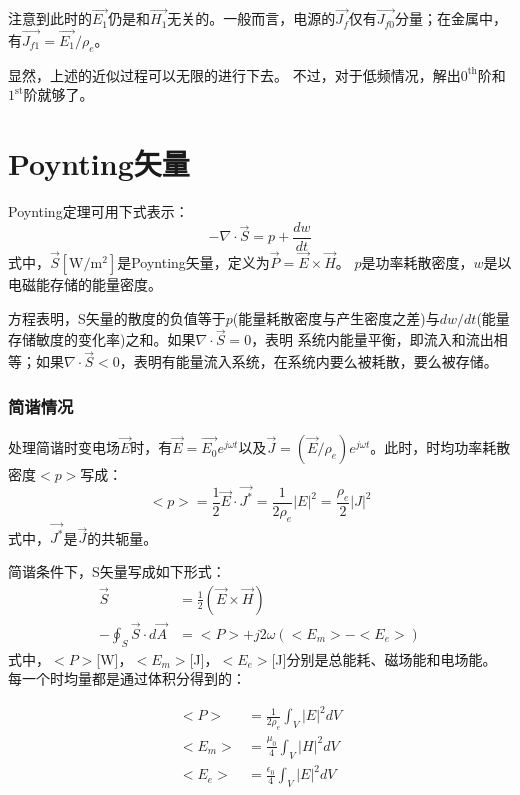 注意到此时的$\vec{E_1}$仍是和$\vec{H_1}$无关的。一般而言，电源的$\vec{J_f}$仅有$\vec{J_{f0}}$分量；在金属中，有$\vec{J_{f1}}=\vec{E_1}/\rho_e$。

显然，上述的近似过程可以无限的进行下去。
不过，对于低频情况，解出$\mathrm{0^{th}}$阶和$\mathrm{1^{st}}$阶就够了。

\section{Poynting矢量}
Poynting定理可用下式表示：
\begin{equation}\label{eqn:poynting}
-\nabla\cdot \vec{S}=p+\frac{dw}{dt}
\end{equation}
式中，$\vec{S}[\mathrm{W/m^2}]$是Poynting矢量，定义为$\vec{P}=\vec{E}\times \vec{H}$。
$p$是功率耗散密度，$w$是以电磁能存储的能量密度。

方程表明，S矢量的散度的负值等于$p$(能量耗散密度与产生密度之差)与$dw/dt$(能量存储敏度的变化率)之和。如果$\nabla \cdot \vec{S}=0$，表明
系统内能量平衡，即流入和流出相等；如果$\nabla \cdot \vec{S}<0$，表明有能量流入系统，在系统内要么被耗散，要么被存储。

\subsubsection{简谐情况}
处理简谐时变电场$\vec{E}$时，有$\vec{E}=\vec{E_0}e^{j\omega t}$以及$\vec{J}=(\vec{E}/\rho_e)e^{j\omega t}$。此时，时均功率耗散密度$<p>$写成：
\begin{equation}\label{eqn:poynting sincase}
  <p>=\frac{1}{2}\vec{E}\cdot \vec{J^*}=\frac{1}{2\rho_e}|E|^2=\frac{\rho_e}{2}|J|^2
\end{equation}
式中，$\vec{J^*}$是$\vec{J}$的共轭量。

简谐条件下，S矢量写成如下形式：
\begin{subequations}\label{eqn:poynting s-vector sin}
	\begin{align}
\vec{S}&=\frac{1}{2}(\vec{E}\times \vec{H}) \\
-\oint_S \vec{S}\cdot d\vec{A}&=<P>+j2\omega (<E_m>-<E_e>)
	\end{align}
\end{subequations}
式中，$<P>$[W]，$<E_m>$[J]，$<E_e>$[J]分别是总能耗、磁场能和电场能。
每一个时均量都是通过体积分得到的：

\begin{subequations}
	\begin{align}
<P>&= \frac{1}{2\rho_e}\int_V|E|^2dV\\
<E_m>&= \frac{\mu_0}{4}\int_V|H|^2dV \\
<E_e>&= \frac{\epsilon_0}{4}\int_V|E|^2dV
	\end{align}
\end{subequations}

